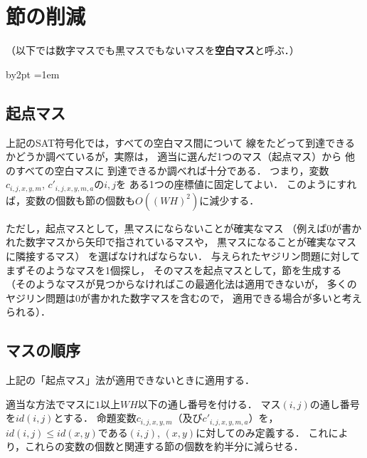 \documentclass[a4j]{jarticle}
\newcommand{\←}{{\leftarrow}}
\newcommand{\→}{{\rightarrow}}
\newcommand{\↑}{{\uparrow}}
\newcommand{\↓}{{\downarrow}}
\begin{document}
\section{節の削減}


（以下では数字マスでも黒マスでもないマスを\textbf{空白マス}と呼ぶ．）

\newcommand{\id}{\mathit{id}}
\advance\parskip by2pt
\parindent=1em

\subsection{起点マス}

上記のSAT符号化では，すべての空白マス間について
線をたどって到達できるかどうか調べているが，実際は，
適当に選んだ1つのマス（起点マス）から
他のすべての空白マスに
到達できるか調べれば十分である．
つまり，変数$c_{i,j,x,y,m}$, $c'_{i,j,x,y,m,a}$の$i,j$を
ある1つの座標値に固定してよい．
このようにすれば，変数の個数も節の個数も$O((WH)^2)$に減少する．

ただし，起点マスとして，黒マスにならないことが確実なマス
（例えば$0$が書かれた数字マスから矢印で指されているマスや，
黒マスになることが確実なマスに隣接するマス）
を選ばなければならない．
与えられたヤジリン問題に対してまずそのようなマスを1個探し，
そのマスを起点マスとして，節を生成する
（そのようなマスが見つからなければこの最適化法は適用できないが，
多くのヤジリン問題は$0$が書かれた数字マスを含むので，
適用できる場合が多いと考えられる）．


\subsection{マスの順序}

上記の「起点マス」法が適用できないときに適用する．

適当な方法でマスに$1$以上$WH$以下の通し番号を付ける．
マス$(i,j)$の通し番号を$\id(i,j)$とする．
%
命題変数$c_{i,j,x,y,m}$（及び$c'_{i,j,x,y,m,a}$）を，
$\id(i,j)\le\id(x,y)$である$(i,j)$, $(x,y)$に対してのみ定義する．
これにより，これらの変数の個数と関連する節の個数を約半分に減らせる．
\end{document}
